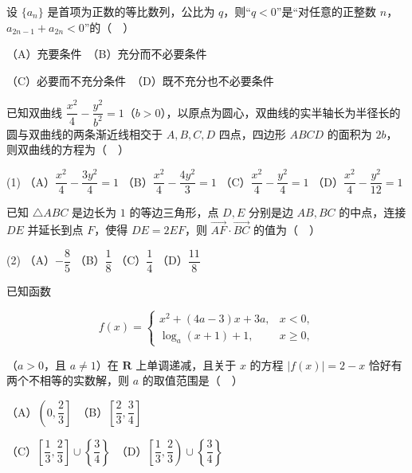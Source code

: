 \begin{question}
设 \(\{a_{n}\}\) 是首项为正数的等比数列，公比为 \(q\)，则“\(q<0\)”是“对任意的正整数 \(n\)，\(a_{2n-1}+a_{2n}<0\)”的（　）

（A）充要条件　（B）充分而不必要条件

（C）必要而不充分条件　（D）既不充分也不必要条件

\end{question}
\begin{question}
已知双曲线 \(\dfrac{x^{2}}{4}-\dfrac{y^{2}}{b^{2}}=1\)（\(b>0\)），以原点为圆心，双曲线的实半轴长为半径长的圆与双曲线的两条渐近线相交于 \(A,B,C,D\) 四点，四边形 \(ABCD\) 的面积为 \(2b\)，则双曲线的方程为（　）

\begin{gkopts}(1)
\task （A）\(\dfrac{x^{2}}{4}-\dfrac{3y^{2}}{4}=1\)
\task （B）\(\dfrac{x^{2}}{4}-\dfrac{4y^{2}}{3}=1\)
\task （C）\(\dfrac{x^{2}}{4}-\dfrac{y^{2}}{4}=1\)
\task （D）\(\dfrac{x^{2}}{4}-\dfrac{y^{2}}{12}=1\)
\end{gkopts}

\end{question}
\begin{question}
已知 \(\triangle ABC\) 是边长为 \(1\) 的等边三角形，点 \(D,E\) 分别是边 \(AB,BC\) 的中点，连接 \(DE\) 并延长到点 \(F\)，使得 \(DE=2EF\)，则 \(\overrightarrow{AF}\cdot\overrightarrow{BC}\) 的值为（　）

\begin{gkopts}(2)
\task （A）\(-\dfrac{8}{5}\)
\task （B）\(\dfrac{1}{8}\)
\task （C）\(\dfrac{1}{4}\)
\task （D）\(\dfrac{11}{8}\)
\end{gkopts}

\Needspace{0.49\textheight}

\end{question}
\begin{question}
已知函数

\nopagebreak[4]
\[
f(x)=\begin{cases}
x^{2}+(4a-3)x+3a, & x<0,\\
\log_{a}(x+1)+1, & x\geqslant 0,
\end{cases}
\]

（\(a>0\)，且 \(a\neq 1\)）在 \(\mathbf{R}\) 上单调递减，且关于 \(x\) 的方程 \(|f(x)|=2-x\) 恰好有两个不相等的实数解，则 \(a\) 的取值范围是（　）

（A）\(\left(0,\dfrac{2}{3}\right]\)　（B）\(\left[\dfrac{2}{3},\dfrac{3}{4}\right]\)

（C）\(\left[\dfrac{1}{3},\dfrac{2}{3}\right]\cup\left\{\dfrac{3}{4}\right\}\)　（D）\(\left[\dfrac{1}{3},\dfrac{2}{3}\right)\cup\left\{\dfrac{3}{4}\right\}\)

\end{question}

